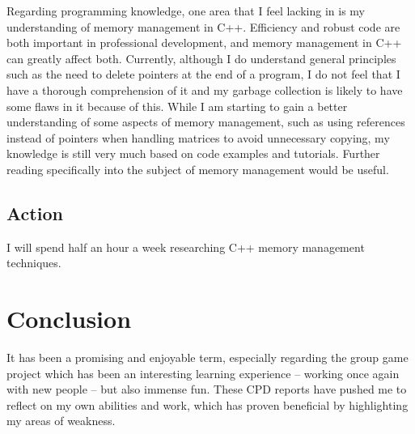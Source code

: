 \documentclass{scrartcl}
\begin{document}
Regarding programming knowledge, one area that I feel lacking in is my understanding of memory management in C++. Efficiency and robust code are both important in professional development, and memory management in C++ can greatly affect both. Currently, although I do understand general principles such as the need to delete pointers at the end of a program, I do not feel that I have a thorough comprehension of it and my garbage collection is likely to have some flaws in it because of this. 
While I am starting to gain a better understanding of some aspects of memory management, such as using references instead of pointers when handling matrices to avoid unnecessary copying, my knowledge is still very much based on code examples and tutorials. Further reading specifically into the subject of memory management would be useful.


\subsection{Action} 

I will spend half an hour a week researching C++ memory management techniques. 


\section{Conclusion}

It has been a promising and enjoyable term, especially regarding the group game project which has been an interesting learning experience – working once again with new people – but also immense fun. These CPD reports have pushed me to reflect on my own abilities and work, which has proven beneficial by highlighting my areas of weakness. 



%
\end{document}
